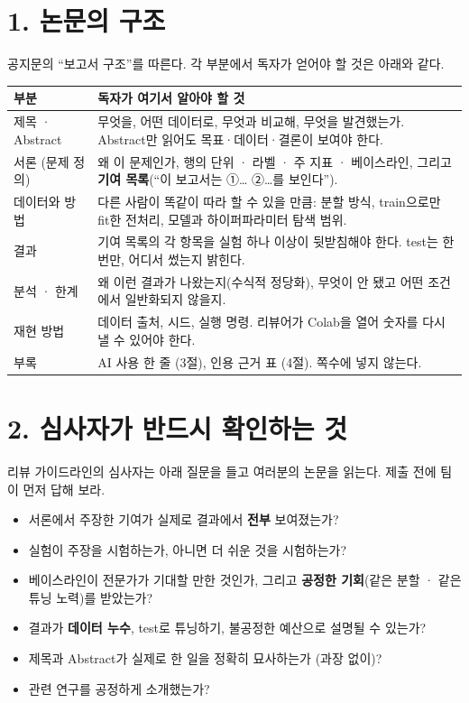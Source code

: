 \documentclass[11pt]{article}
\begin{document}
\section*{1. 논문의 구조}
공지문의 ``보고서 구조''를 따른다. 각 부분에서 독자가 얻어야 할 것은 아래와 같다.
\begin{center}
\small
\begin{tabular}{@{}p{3.0cm}p{10.2cm}@{}}
\toprule
\textbf{부분} & \textbf{독자가 여기서 알아야 할 것} \\
\midrule
제목 · Abstract & 무엇을, 어떤 데이터로, 무엇과 비교해, 무엇을 발견했는가. Abstract만 읽어도 목표·데이터·결론이 보여야 한다. \\
서론 (문제 정의) & 왜 이 문제인가, 행의 단위 · 라벨 · 주 지표 · 베이스라인, 그리고 \textbf{기여 목록}(``이 보고서는 ①… ②…를 보인다''). \\
데이터와 방법 & 다른 사람이 똑같이 따라 할 수 있을 만큼: 분할 방식, train으로만 fit한 전처리, 모델과 하이퍼파라미터 탐색 범위. \\
결과 & 기여 목록의 각 항목을 실험 하나 이상이 뒷받침해야 한다. test는 한 번만, 어디서 썼는지 밝힌다. \\
분석 · 한계 & 왜 이런 결과가 나왔는지(수식적 정당화), 무엇이 안 됐고 어떤 조건에서 일반화되지 않을지. \\
재현 방법 & 데이터 출처, 시드, 실행 명령. 리뷰어가 Colab을 열어 숫자를 다시 낼 수 있어야 한다. \\
부록 & AI 사용 한 줄 (3절), 인용 근거 표 (4절). 쪽수에 넣지 않는다. \\
\bottomrule
\end{tabular}
\end{center}

\section*{2. 심사자가 반드시 확인하는 것}
리뷰 가이드라인의 심사자는 아래 질문을 들고 여러분의 논문을 읽는다. 제출 전에 팀이 먼저 답해 보라.
\begin{itemize}
\item 서론에서 주장한 기여가 실제로 결과에서 \textbf{전부} 보여졌는가?
\item 실험이 주장을 시험하는가, 아니면 더 쉬운 것을 시험하는가?
\item 베이스라인이 전문가가 기대할 만한 것인가, 그리고 \textbf{공정한 기회}(같은 분할 · 같은 튜닝 노력)를 받았는가?
\item 결과가 \textbf{데이터 누수}, test로 튜닝하기, 불공정한 예산으로 설명될 수 있는가?
\item 제목과 Abstract가 실제로 한 일을 정확히 묘사하는가 (과장 없이)?
\item 관련 연구를 공정하게 소개했는가?
\end{itemize}
\end{document}
